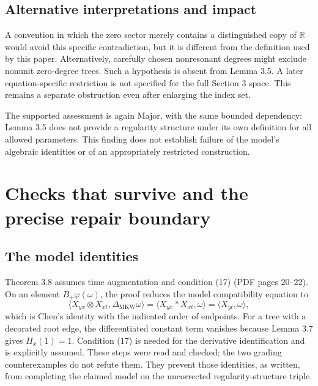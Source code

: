 \documentclass[10pt]{article}
\begin{document}
\subsection*{Alternative interpretations and impact}
A convention in which the zero sector merely contains a distinguished copy of \(\mathbb R\) would avoid this specific contradiction, but it is different from the definition used by this paper. Alternatively, carefully chosen nonresonant degrees might exclude nonunit zero-degree trees. Such a hypothesis is absent from Lemma 3.5. A later equation-specific restriction is not specified for the full Section 3 space. This remains a separate obstruction even after enlarging the index set.\par
The supported assessment is again Major, with the same bounded dependency: Lemma 3.5 does not provide a regularity structure under its own definition for all allowed parameters. This finding does not establish failure of the model’s algebraic identities or of an appropriately restricted construction.\par
\section*{Checks that survive and the precise repair boundary}
\subsection*{The model identities}
Theorem 3.8 assumes time augmentation and condition (17) (PDF pages 20–22). On an element \(B_+\varphi(\omega)\), the proof reduces the model compatibility equation to \[\langle X_{yx}\otimes X_{xt},\Delta_{\mathrm{MKW}}\omega\rangle
 =\langle X_{yx}*X_{xt},\omega\rangle
 =\langle X_{yt},\omega\rangle,\] which is Chen’s identity with the indicated order of endpoints. For a tree with a decorated root edge, the differentiated constant term vanishes because Lemma 3.7 gives \(\Pi_x(1)=1\). Condition (17) is needed for the derivative identification and is explicitly assumed. These steps were read and checked; the two grading counterexamples do not refute them. They prevent those identities, as written, from completing the claimed model on the uncorrected regularity-structure triple.\par
\end{document}
